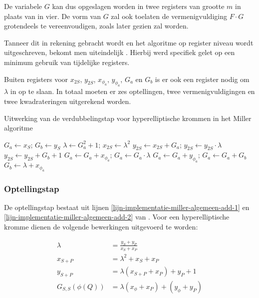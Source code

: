 De variabele $G$ kan dus opgeslagen worden in twee registers van grootte $m$ in plaats van in vier. De vorm van $G$ zal ook toelaten de vermenigvuldiging $F \cdot G$ grotendeels te vereenvoudigen, zoals later gezien zal worden.

Tanneer dit in rekening gebracht wordt en het algoritme op register niveau wordt uitgeschreven, bekomt men uiteindelijk . Hierbij werd specifiek gelet op een minimum gebruik van tijdelijke registers.

Buiten registers voor $x_{2S}$, $y_{2S}$, $x_{\phi_a}$, $y_{\phi_a}$, $G_a$ en $G_b$ is er ook een register nodig om $\lambda$ in op te slaan. In totaal moeten er zes optellingen, twee vermenigvuldigingen en twee kwadrateringen uitgerekend worden.

\begin{algorithm}[h]
	\caption{Uitwerking van de verdubbelingstap voor hyperelliptische krommen in het Miller algoritme}
	\label{algoritme-implementatie-miller-double-detail}
	$G_a \leftarrow x_S$; $G_b \leftarrow y_S$\;
	$\lambda \leftarrow G_a^2 + 1$; $x_{2S} \leftarrow \lambda ^2$\;
	$y_{2S} \leftarrow x_{2S} + G_a$; $y_{2S} \leftarrow y_{2S} \cdot \lambda$\;
	$y_{2S} \leftarrow y_{2S} + G_b + 1$\;
	$G_a \leftarrow G_a + x_{\phi_a}$; $G_a \leftarrow G_a \cdot \lambda$\;
	$G_a \leftarrow G_a + y_{\phi_a}$; $G_a \leftarrow G_a + G_b$\;
	$G_b \leftarrow \lambda + x_{\phi_a}$\;
\end{algorithm}

\subsubsection{Optellingstap}

De optellingstap bestaat uit lijnen \ref{lijn-implementatie-miller-algemeen-add-1} en \ref{lijn-implementatie-miller-algemeen-add-2} van . Voor een hyperelliptische kromme dienen de volgende bewerkingen uitgevoerd te worden\cite{bertoni}:

\[\begin{aligned}
	\lambda &= \frac{y_S + y_P}{x_S + x_P}\\
	x_{S + P} &= \lambda ^2 + x_S + x_P\\
	y_{S + P} &= \lambda (x_{S+P} + x_P) + y_P + 1\\
	G_{S,S}(\phi(Q)) &= \lambda (x_{\phi} + x_P) + (y_{\phi} + y_P)\\
\end{aligned}\]

